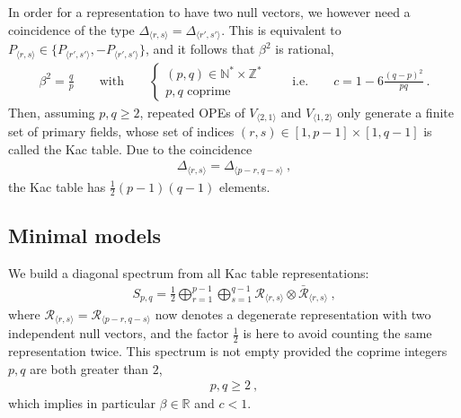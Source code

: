 \documentclass[12pt, a4paper]{article}
\theoremstyle{break}
\begin{document}
In order for a representation to have two null vectors, we however need a coincidence of 
the type $\Delta_{\langle r,s \rangle} = \Delta_{\langle r',s' \rangle}$. 
This is equivalent to $P_{\langle r,s \rangle} \in \{ P_{\langle r',s' \rangle}, -P_{\langle r',s' \rangle}\}$, and it follows that
$\beta^2$ is rational,
\begin{align} 
 \beta^2 =  \frac{q}{p} \qquad \text{with} \qquad \left\{\begin{array}{l} (p,q)\in \mathbb{N}^*\times \mathbb{Z}^* \\ p, q\text{ coprime} \end{array} \right. 
 \qquad \text{i.e.} \qquad c = 1-6\frac{(q-p)^2}{pq}\ .
 \label{eq:bcmin}
\end{align}
Then, assuming $p,q\geq 2$, repeated OPEs of $V_{\langle 2,1\rangle}$ and $V_{\langle 1,2\rangle}$ only generate a finite set of primary fields, whose set of indices $(r,s)\in [1, p-1]\times [1,q-1]$ is called the Kac table. Due to the coincidence 
\begin{align}
 \Delta_{\langle r,s \rangle} = \Delta_{\langle p-r, q-s\rangle}\ ,
\end{align}
the Kac table has $\frac12 (p-1)(q-1)$ elements.

\subsection{Minimal models}

We build a diagonal spectrum from all Kac table representations:
\begin{align}
 S_{p, q} = \frac12 \bigoplus_{r=1}^{p-1} \bigoplus_{s=1}^{q-1} \mathcal{R}_{\langle r,s \rangle}\otimes \mathcal{\bar{R}}_{\langle r,s \rangle}\ ,
\end{align}
where  $\mathcal{R}_{\langle r,s \rangle}=\mathcal{R}_{\langle p-r,q-s \rangle}$ now denotes a degenerate representation with two independent null vectors, and the factor $\frac12$ is here to avoid counting the same representation twice.
This spectrum is not empty provided the coprime integers $p,q$ are both greater than $2$,
\begin{align}
 p,q \geq 2 \ ,
 \label{eq:pqmin}
\end{align}
which implies in particular $\beta\in \mathbb{R}$ and $c<1$. 
\end{document}
